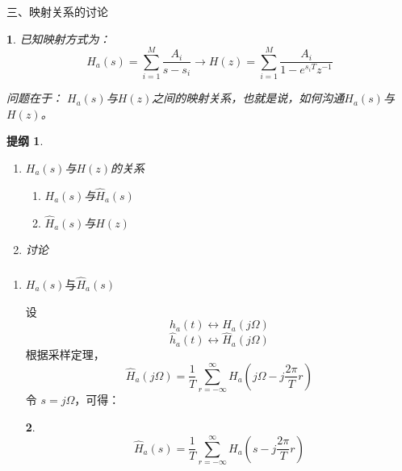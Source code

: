 \documentclass[notheorems,compress,mathserif,table]{beamer}
\newtheorem{dablock}{}
\newtheorem{jytg}{提纲}
\begin{document}
%
%
\begin{frame}[shrink]\frametitle{}%
三、映射关系的讨论
\begin{dablock}
已知映射方式为：
$$H_a(s)= \sum_{i=1}^{M}\frac{A_i}{s-s_i}\longrightarrow H(z) = \sum_{i=1}^{M}\frac{A_{i}}{1-e^{s_{i}T}z^{-1}}$$

问题在于： $H_a(s)$与$H(z)$之间的映射关系，也就是说，如何沟通$H_a(s)$与$H(z)$。
\end{dablock}
\begin{jytg}
\begin{enumerate}
\item [1] $H_a(s)$与$H(z)$的关系
       \begin{enumerate}
         \item[(a)] $H_a(s)$与$\hat{H}_a(s)$\par
         \item[(b)] $\hat{H}_a(s)$与$H(z)$
       \end{enumerate}
\item [2] 讨论
\end{enumerate}
\end{jytg}
\end{frame}
%
%
\begin{frame}[shrink]\frametitle{}%
\begin{enumerate}
    \item[(a)] $H_a(s)$与$\hat{H}_a(s)$\par
        设
        $$h_a(t)\longleftrightarrow H_a(j\Omega)$$
        $$\hat{h}_a(t)\longleftrightarrow \hat{H}_a(j\Omega)$$
        根据采样定理，
        $$\hat{H}_a(j\Omega) = \frac{1}{T}
        \sum_{r=-\infty}^{\infty}H_a(j\Omega-j\frac{2\pi}{T}r)$$
        令 $s=j\Omega$，可得：
        \begin{dablock}
        $$\hat{H}_a(s) = \frac{1}{T}
        \sum_{r=-\infty}^{\infty}H_a(s-j\frac{2\pi}{T}r)$$
        \end{dablock}
\end{enumerate}


\end{frame}
\end{document}

